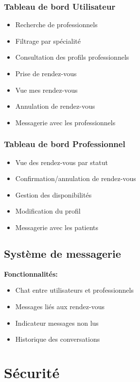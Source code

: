 \documentclass[12pt,a4paper]{article}
\begin{document}
\subsubsection{Tableau de bord Utilisateur}
\begin{itemize}
    \item[\checkmark] Recherche de professionnels
    \item[\checkmark] Filtrage par spécialité
    \item[\checkmark] Consultation des profils professionnels
    \item[\checkmark] Prise de rendez-vous
    \item[\checkmark] Vue mes rendez-vous
    \item[\checkmark] Annulation de rendez-vous
    \item[\checkmark] Messagerie avec les professionnels
\end{itemize}

\subsubsection{Tableau de bord Professionnel}
\begin{itemize}
    \item[\checkmark] Vue des rendez-vous par statut
    \item[\checkmark] Confirmation/annulation de rendez-vous
    \item[\checkmark] Gestion des disponibilités
    \item[\checkmark] Modification du profil
    \item[\checkmark] Messagerie avec les patients
\end{itemize}

\subsection{Système de messagerie}

\textbf{Fonctionnalités:}
\begin{itemize}
    \item[\checkmark] Chat entre utilisateurs et professionnels
    \item[\checkmark] Messages liés aux rendez-vous
    \item[\checkmark] Indicateur messages non lus
    \item[\checkmark] Historique des conversations
\end{itemize}

\section{Sécurité}
\end{document}
